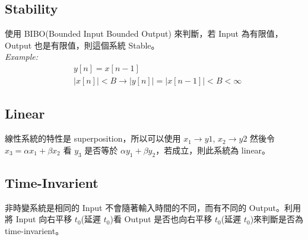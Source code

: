 \documentclass[12pt, a4paper]{article}
\begin{document}
\subsection*{Stability}
使用 BIBO(Bounded Input Bounded Output) 來判斷，若 Input 為有限值， Output 也是有限值，則這個系統 Stable。\\
\textit{Example:}
\begin{align*}
	&y[n] = x[n-1] \\
	&\left| x[n] \right| < B \to \left|y[n] \right| = \left| x[n-1] \right| < B < \infty
\end{align*}
\subsection*{Linear}
線性系統的特性是 superposition，所以可以使用 $x_1 \to y1$, $x_2 \to y2$ 然後令 $x_3 = \alpha x_1 + \beta x_2$ 看 $y_3$ 是否等於 $\alpha y_1 + \beta y_2$，若成立，則此系統為 linear。
\subsection*{Time-Invarient}
非時變系統是相同的 Input 不會隨著輸入時間的不同，而有不同的 Output。利用將 Input 向右平移 $t_0$(延遲 $t_0$)看 Output 是否也向右平移 $t_0$(延遲 $t_0$)來判斷是否為 time-invarient。
\newpage
\end{document}
